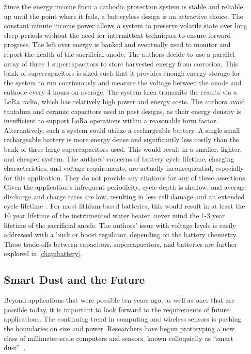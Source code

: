 Since the energy income from a cathodic protection system is stable and reliable up until the point where it fails, a batteryless design is an attractive choice.
The constant minute income power allows a system to preserve volatile state over long sleep periods without the need for intermittent techniques to ensure forward progress.
The left over energy is banked and eventually used to monitor and report the health of the sacrificial anode.
The authors decide to use a parallel array of three 1\ssi{\farad} supercapacitors to store harvested energy from corrosion.
This bank of supercapacitors is sized such that it provides enough energy storage for the system to run continuously and measure the voltage between the anode and cathode every 4 hours on average.
The system then transmits the results via a LoRa radio, which has relatively high power and energy costs.
The authors avoid tantalum and ceramic capacitors used in past designs, as their energy density is insufficient to support LoRa operations within a reasonable form factor.
Alternatively, such a system could utilize a rechargeable battery.
A single small rechargeable battery is more energy dense and significantly less costly than the bank of three large supercapacitors used.
This would result in a smaller, lighter, and cheaper system.
The authors' concerns of battery cycle lifetime, charging characteristics, and voltage requirements, are actually inconsequential, especially for this application.
They do not provide any citations for any of these assertions.
Given the application's infrequent periodicity, cycle depth is shallow, and average discharge and charge rates are low, resulting in less cell damage and an extended cycle lifetime~\cite{omarLithium14,wangCycle11}.
For most lithium-based batteries, this would result in at least the 10 year lifetime of the instrumented water heater, never mind the 1-3 year lifetime of the sacrificial anode.
The authors' issue with voltage levels is easily addressed with a buck or boost regulator, depending on the battery chemistry.
These trade-offs between capacitors, supercapacitors, and batteries are further explored in \cref{chap:battery}.

\subsection{Smart Dust and the Future}
Beyond applications that were possible ten years ago, as well as ones that are possible today, it is important to look forward to the requirements of future applications.
The continuing trend in computing and wireless sensors is pushing the boundaries on size and power.
Researchers have begun prototyping a new class of  
millimeter-scale computers and sensors, known colloquially as ``smart dust''~\cite{warneke2001smart}.

